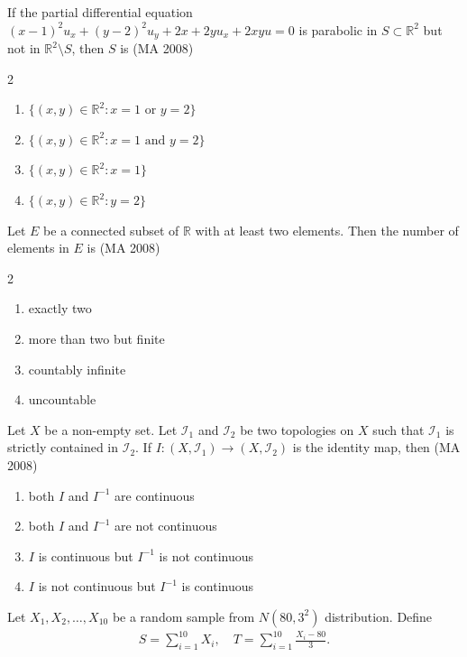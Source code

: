 \item If the partial differential equation \((x-1)^2 u_x + (y-2)^2 u_y + 2 x + 2 y u_x + 2 x y u = 0\) is parabolic in \(S \subset \mathbb{R}^2\) but not in \(\mathbb{R}^2 \setminus S\), then \(S\) is
\hfill (MA 2008)
\begin{multicols}{2}
\begin{enumerate}
\item \(\{(x,y) \in \mathbb{R}^2 : x=1 \text{ or } y=2\}\)
\item \(\{(x,y) \in \mathbb{R}^2 : x=1 \text{ and } y=2\}\)
\item \(\{(x,y) \in \mathbb{R}^2 : x=1\}\)
\item \(\{(x,y) \in \mathbb{R}^2 : y=2\}\)
\end{enumerate}
\end{multicols}

\item Let \(E\) be a connected subset of \(\mathbb{R}\) with at least two elements. Then the number of elements in \(E\) is
\hfill (MA 2008)
\begin{multicols}{2}
\begin{enumerate}
\item exactly two
\item more than two but finite
\item countably infinite
\item uncountable
\end{enumerate}
\end{multicols}

\item Let \(X\) be a non-empty set. Let \(\mathcal{I}_1\) and \(\mathcal{I}_2\) be two topologies on \(X\) such that \(\mathcal{I}_1\) is strictly contained in \(\mathcal{I}_2\). If \(I : (X, \mathcal{I}_1) \to (X, \mathcal{I}_2)\) is the identity map, then
\hfill (MA 2008)

\begin{enumerate}
\item both \(I\) and \(I^{-1}\) are continuous
\item both \(I\) and \(I^{-1}\) are not continuous
\item \(I\) is continuous but \(I^{-1}\) is not continuous
\item \(I\) is not continuous but \(I^{-1}\) is continuous
\end{enumerate}


\item Let \(X_1, X_2, \ldots, X_{10}\) be a random sample from \(N(80, 3^2)\) distribution. Define
\begin{align}
    S = \sum_{i=1}^{10} X_i, \quad T = \sum_{i=1}^{10} \frac{X_i - 80}{3}.
\end{align}


